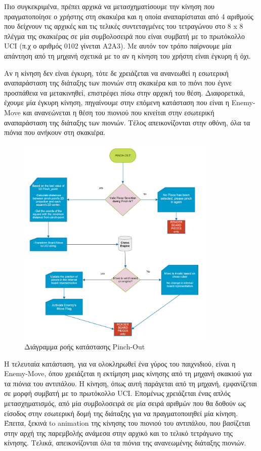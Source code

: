 Πιο συγκεκριμένα, πρέπει αρχικά να μετασχηματίσουμε την κίνηση που πραγματοποίησε ο χρήστης στη σκακιέρα και η οποία αναπαρίσταται από 4 αριθμούς που δείχνουν τις αρχικές και τις τελικές συντεταγμένες του τετραγώνου στο 8 x 8 πλέγμα της σκακιέρας σε μία συμβολοσειρά που είναι συμβατή με το πρωτόκολλο UCI (π.χ ο αριθμός 0102 γίνεται A2A3). Με αυτόν τον τρόπο παίρνουμε μία απάντηση από τη μηχανή σχετικά με το αν η κίνηση του χρήστη είναι έγκυρη ή όχι. 


Αν η κίνηση δεν είναι έγκυρη, τότε δε χρειάζεται να ανανεωθεί η εσωτερική αναπαράσταση της διάταξης των πιονιών στη σκακιέρα και το πιόνι που έγινε προσπάθεια να μετακινηθεί, επιστρέφει πίσω στην αρχική του θέση. Διαφορετικά, έχουμε μία έγκυρη κίνηση, πηγαίνουμε στην επόμενη κατάσταση που είναι η Enemy-Move και ανανεώνεται η θέση του πιονιού που κινείται στην εσωτερική αναπαράσταση της διάταξης των πιονιών. Τέλος απεικονίζονται στην οθόνη, όλα τα πιόνια που ανήκουν στη σκακιέρα.


\begin{figure}[H]
    \centering
    \includegraphics[width=0.85\textwidth]{Files/Figures/pinch_out.png}
    \caption[Διάγραμμα ροής κατάστασης Pinch-Out]{Διάγραμμα ροής κατάστασης Pinch-Out}
    \label{fig:pinch_out}
\end{figure}



Η τελευταία κατάσταση, για να ολοκληρωθεί ένα γύρος του παιχνιδιού, είναι η Enemy-Move, όπου χρειάζεται η εκτίμηση μιας κίνησης από τη μηχανή σκακιού για τα πιόνια του αντιπάλου. Η κίνηση, όπως αυτή παράγεται από τη μηχανή, εμφανίζεται σε μορφή συμβατή με το πρωτόκολλο UCI. Επομένως χρειάζεται ένας απλός μετασχηματισμός, από μία συμβολοσειρά σε μία σειρά αριθμών που θα δοθούν ως είσοδος στην εσωτερική δομή της διάταξης για να πραγματοποιηθεί μία κίνηση.
Έπειτα, ξεκινά to animation της κίνησης του πιονιού του αντιπάλου, που βασίζεται στην αρχή της παρεμβολής ανάμεσα στην αρχικό και το τελικό τετράγωνο της κίνησης. Τελικά, απεικονίζονται όλα τα πιόνια της ανανεωμένης διάταξης πιονιών.


